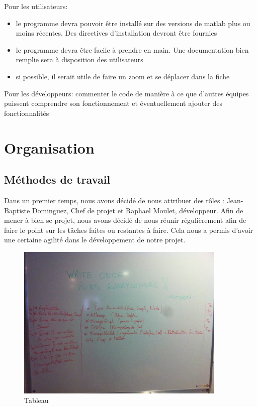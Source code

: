 \documentclass[pidr]{tnreport}
\begin{document}
Pour les utilisateurs:
\begin{itemize}
\item le programme devra pouvoir être installé sur des versions de matlab plus ou moins récentes. Des directives d’installation devront être fournies
\item le programme devra être facile à prendre en main. Une documentation bien remplie sera à disposition des utilisateurs
\item si possible, il serait utile de faire un zoom et se déplacer dans la fiche
\end{itemize}

Pour les développeurs:
commenter le code de manière à ce que d’autres équipes puissent comprendre son fonctionnement et éventuellement ajouter des fonctionnalités

\cleardoublepage

\chapter{Organisation}

\section{Méthodes de travail}

Dans un premier temps, nous avons décidé de nous attribuer des rôles : Jean-Baptiste Dominguez, Chef de projet et Raphael Moulet, développeur. Afin de mener à bien se projet, nous avons décidé de nous réunir régulièrement afin de faire le point sur les tâches faites ou restantes à faire. Cela nous a permis d’avoir une certaine agilité dans le développement de notre projet.

\begin{figure}[h]
  \centering
  \includegraphics[width=10cm]{figures/tableau}
  \caption{Tableau}
  \label{fig:tableau}
\end{figure}
\end{document}
